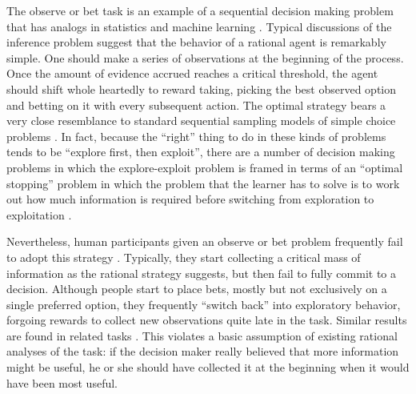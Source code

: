 \documentclass[authoryear]{elsarticle}
\begin{document}
The observe or bet task is an example of a sequential decision making problem that has analogs in statistics \citep{wald_sequential_1947} and machine learning \citep{kaelbling_planning_1998}. Typical discussions of the inference problem suggest that the behavior of a rational agent is remarkably simple. One should make a series of observations at the beginning of the process. Once the amount of evidence accrued reaches a critical threshold, the agent should shift whole heartedly to reward taking, picking the best observed option and betting on it with every subsequent action. The optimal strategy bears a very close resemblance to standard sequential sampling models of simple choice problems \citep[e.g.,][]{ratcliff_theory_1978,vickers_decision_1979,ratcliff_comparison_2004}. In fact, because the ``right'' thing to do in these kinds of problems tends to be ``explore first, then exploit'', there are a number of decision making problems in which the explore-exploit problem is framed in terms of an ``optimal stopping'' problem in which the problem that the learner has to solve is to work out how much information is required before switching from exploration to exploitation \citep[e.g.][]{lee_hierarchical_2006,todd_pride_1999}.


Nevertheless, human participants given an observe or bet problem frequently fail to adopt this strategy \citep{tversky_information_1966,rakow_role_2010}. Typically, they start collecting a critical mass of information as the rational strategy suggests, but then fail to fully commit to a decision. Although people start to place bets, mostly but not exclusively on a single preferred option, they frequently ``switch back'' into exploratory behavior, forgoing rewards to collect new observations quite late in the task. Similar results are found in related tasks \citep{sang_learning_2011}. This violates a basic assumption of existing rational analyses of the task: if the decision maker really believed that more information might be useful, he or she should have collected it at the beginning when it would have been most useful.
\end{document}
